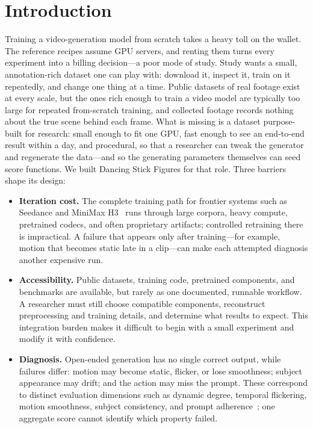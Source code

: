 \documentclass[10pt,twocolumn,letterpaper]{article}
\begin{document}
\section{Introduction}
Training a video-generation model from scratch takes a heavy toll on the wallet. The reference recipes
assume GPU servers, and renting them turns every experiment into a billing decision---a poor mode of study.
Study wants a small, annotation-rich dataset one can play with: download it, inspect it, train on it
repeatedly, and change one thing at a time. Public datasets of real footage exist at every scale, but the
ones rich enough to train a video model are typically too large for repeated from-scratch training, and
collected footage records nothing about the true scene behind each frame. What is missing is a dataset
purpose-built for research: small enough to fit one GPU, fast enough to see an end-to-end result within a
day, and procedural, so that a researcher can tweak the generator and regenerate the data---and so the
generating parameters themselves can seed score functions. We built Dancing Stick Figures for that role.
Three barriers shape its design:
\begin{itemize}[leftmargin=*,nosep]
\item \textbf{Iteration cost.} The complete training path for frontier systems such as Seedance and MiniMax
H3~\cite{gao2025seedance,minimax2026h3} runs through large corpora, heavy compute, pretrained codecs, and often
proprietary artifacts; controlled retraining there is impractical. A failure that appears only after
training---for example, motion that becomes static late in a clip---can make each attempted diagnosis
another expensive run.
\item \textbf{Accessibility.} Public datasets, training code, pretrained components, and benchmarks are
available, but rarely as one documented, runnable workflow. A researcher must still choose compatible
components, reconstruct preprocessing and training details, and determine what results to expect. This
integration burden makes it difficult to begin with a small experiment and modify it with confidence.
\item \textbf{Diagnosis.} Open-ended generation has no single correct output, while failures differ: motion
may become static, flicker, or lose smoothness; subject appearance may drift; and the action may miss the
prompt. These correspond to distinct evaluation dimensions such as dynamic degree, temporal flickering,
motion smoothness, subject consistency, and prompt adherence~\cite{huang2023vbench}; one aggregate score
cannot identify which property failed.
\end{itemize}
\end{document}
